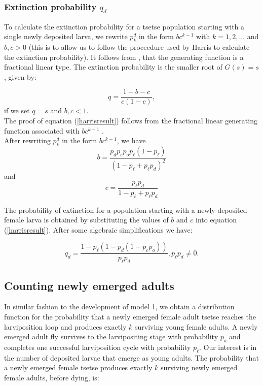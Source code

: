\documentclass[smallextended]{svjour3}
\begin{document}
\subsubsection{Extinction probability  $q_{d}$}

To calculate the extinction probability for a tsetse population starting with a single newly deposited larva, we rewrite $p_{k}^{d}$ in the form $bc^{k-1}$ with $k =1,2,...$ and $b,c > 0$ (this is to allow us to follow the proceedure used by Harris \cite{Harris1965} to calculate the extinction probability). It follows from  \cite{Harris1965}, that the generating function is a fractional linear type. The extinction probability is the smaller root of $G(s)=s$, given by: 

\begin{equation}
\label{harrisresult}
q = \frac{1 - b -c}{c(1-c)},
\end{equation}
if we set $q = s$ and  $b, c < 1$.\\

The proof of equation (\ref{harrisresult}) follows from the fractional linear generating function associated with $bc^{k-1}$ \cite{Harris1965}. \\

After rewriting $p_{k}^{d}$ in the form $bc^{k-1}$, we have  $$b = \frac{p_{d}p_{e}p_{o}p_\ell(1-p_\ell)}{(1-p_\ell + p_\ell p_d)^2}$$ and $$c = \frac{p_\ell p_d}{1-p_\ell + p_\ell p_d}$$ 

The probability of extinction for a population starting with a newly deposited  female larva is obtained by substituting the values of $b$ and $c$ into equation (\ref{harrisresult}). After some algebraic simplifications we have:

\begin{equation}
\label{extictionLarva}
q_{d} = \frac{1-p_{\ell}(1 - p_{d}(1 - p_{e}p_{o}))}{p_{\ell}p_{d}}, p_{\ell}p_{d} \neq 0.
\end{equation}

\subsection{Counting newly emerged adults}

In similar fashion to the development of model 1, we obtain a distribution function for the probability that a newly emerged female adult tsetse reaches the larviposition loop and produces exactly $k$ surviving young female adults.
A newly emerged adult fly survives to the larvipositing stage  with probability $p_{o}$  and  completes one successful larviposition cycle with probability $p_{\ell}$. Our interest is in the number of deposited larvae that emerge as young adults. The probability that a newly emerged female tsetse produces exactly $k$ surviving newly emerged female adults, before dying, is: 
\end{document}
